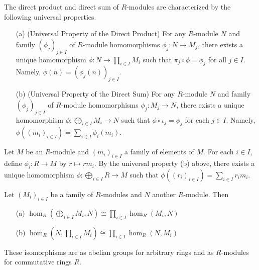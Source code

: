 \documentclass[11pt]{book}
\theoremstyle{definition}   \newtheorem{defn}[counter]{Definition} %
\DeclareMathOperator{\ra}{\rightarrow}   \DeclareMathOperator{\Poly}{\mathbf{P}}   \DeclareMathOperator{\spn}{\textnormal{span}}   \DeclareMathOperator{\aut}{\textnormal{Aut}}
\newcommand{\vs}{\vspace{8pt}}
\numberwithin{counter}{chapter}
\begin{document}
\vs

\begin{remark}
The direct product and direct sum of $R$-modules are characterized by the following universal properties.
\begin{enumerate}
\item[(a)] (Universal Property of the Direct Product) For any $R$-module $N$ and family $(\phi_j)_{j \in I}$ of $R$-module homomorphisms $\phi_j : N \ra M_j$, there exists a unique homomorphism $\phi : N \ra \prod_{i \in I} M_i$ such that $\pi_j \circ \phi = \phi_j$ for all $j \in I$. Namely, $\phi(n) = (\phi_j(n))_{j \in I}$. \quad
{}

\item[(b)] (Universal Property of the Direct Sum) For any $R$-module $N$ and family $(\phi_j)_{j \in I}$ of $R$-module homomorphisms $\phi_j : M_j \ra N$, there exists a unique homomorphism $\phi : \bigoplus_{i \in I} M_i \ra N$ such that $\phi \circ \iota_j = \phi_j$ for each $j \in I$. Namely, $\phi((m_i)_{i \in I}) = \sum_{i \in I} \phi_i(m_i)$. \quad
{}
\end{enumerate}
\end{remark}

\vs

\begin{example*}
Let $M$ be an $R$-module and $(m_i)_{i \in I}$ a family of elements of $M$. For each $i \in I$, define $\phi_i : R \ra M$ by $r \mapsto rm_i$. By the universal property (b) above, there exists a unique homomorphism $\phi : \bigoplus_{i \in I} R \ra M$ such that $\phi((r_i)_{i \in I}) = \sum_{i \in I} r_i m_i$.
\end{example*}

\vs

\begin{lemma}
Let $(M_i)_{i \in I}$ be a family of $R$-modules and $N$ another $R$-module. Then
\begin{enumerate}
\item[(a)] $\hom_R(\bigoplus_{i \in I} M_i,N) \cong \prod_{i \in I} \hom_R(M_i,N)$
\item[(b)] $\hom_R(N,\prod_{i \in I} M_i) \cong \prod_{i \in I} \hom_R(N,M_i)$
\end{enumerate}

These isomorphisms are as abelian groups for arbitrary rings and as $R$-modules for commutative rings $R$.
\end{lemma}
\end{document}
